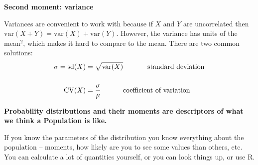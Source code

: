 \documentclass[12pt,xcolor=svgnames]{beamer}
\newcommand{\rd}{\color{red}}
\newcommand{\bl}{\color{blue}}
\newcommand{\theme}{\color{FireBrick}}
\newcommand{\mr}[1]{\mathrm{#1}}
\newcommand{\ds}[1]{\mathds{#1}}
\newcommand{\sk}{\vspace{.4cm}}
\newcommand{\nochap}{\vspace{0.5cm}}
\newcommand{\nsk}{\vspace{-.4cm}}
\newcommand{\chap}[1]{{\theme \Large \bf #1} \sk}
\newcommand{\E}{\ds{E}}
\newcommand{\var}{\text{var}}
\begin{document}
\begin{frame}
\chap{Second moment: variance}

Variances are convenient to work with because if $X$ and $Y$ are uncorrelated then $\var(X+Y)=\var(X)+\var(Y)$. However, the variance has units of the mean$^2$, which makes it hard to compare to the mean. There are two common solutions:
\begin{align*}
\sigma = \mr{sd}(X) & = \sqrt{\var(X)}  \text{ \hspace{1cm} standard deviation} \\
& \\
\mr{CV}(X) & = \frac{\sigma}{\mu} \text{\hspace{1cm} coefficient of variation}
\end{align*}

\end{frame}

\begin{frame}
\nochap

{\bf Probability distributions and their moments are descriptors of what we think a {\rd Population} is like.}

\sk
If you know the parameters of the distribution you know everything about the population -- moments, how likely are you to see some values than others, etc. You can calculate a lot of quantities yourself, or you can look things up, or use {\sf R}. 

\end{frame}

\iffalse
\begin{frame}
\chap{Probability Distributions}

In pairs, go onto wikipedia, and look up details of an assigned distribution on Wikipedia. Take note about if it's continuous/discrete, what type of data it usually describes, what it looks like, parameters, $\E[X]$, \var(X), etc. Be ready to split up and tell others in class about your distributions. 
{\small
\begin{itemize}
\item Bernoulli
\item Binomial
\item Poisson
\item Exponential
\item Gamma
\item Beta
\end{itemize}
}

\end{frame}


\begin{frame}
\chap{Second moment: variance}

{\bl Exercise 2.1:} Given that
\begin{align*}
 \E[X+Y]  & = \E[X] + \E[Y]  \text{ \hspace{0.25cm} and \hspace{0.25cm} }  \E[cX]  = c\E[X] \\
\end{align*}
show that
\nsk
\begin{align*}
 \E[(X-\mu)^2]  = \E[X^2] - (\E[X])^2
\end{align*}
\end{frame}
\fi
\end{document}
